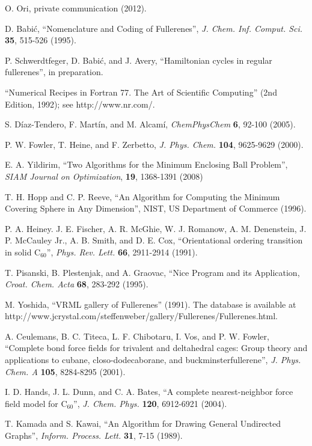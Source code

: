 \documentclass[article,a4paper,twoside]{memoir}
\newcommand{\C}[1]{\ensuremath{\mathrm{C}_{#1}}}
\begin{document}
\begin{thebibliography}{99}
 O. Ori, private communication (2012).

 D. Babi\'c, ``Nomenclature and Coding of Fullerenes'', \textit{J. Chem. Inf. Comput. Sci.} \textbf{35}, 515-526 (1995).

 P. Schwerdtfeger, D. Babi\'c, and J. Avery, ``Hamiltonian cycles in regular fullerenes'', in preparation.

 ``Numerical Recipes in Fortran 77. The Art of Scientific Computing'' (2nd Edition, 1992); see http://www.nr.com/.

 S. D\'iaz-Tendero, F. Mart\'in, and M. Alcam\'i, \textit{ChemPhysChem} \textbf{6}, 92-100 (2005).

 P. W. Fowler, T. Heine, and F. Zerbetto, \textit{J. Phys. Chem.} \textbf{104}, 9625-9629 (2000).

 E. A. Yildirim, ``Two Algorithms for the Minimum Enclosing Ball Problem'', 
\textit{SIAM Journal on Optimization}, \textbf{19}, 1368-1391 (2008) 

 T. H. Hopp and C. P. Reeve, ``An Algorithm for Computing the Minimum Covering Sphere in Any Dimension'', 
NIST, US Department of Commerce (1996).

 P. A. Heiney. J. E. Fischer, A. R. McGhie, W. J. Romanow, A. M. Denenstein, J. P. McCauley Jr., A. B. Smith, and D. E. Cox,
``Orientational ordering transition in solid \C{60}'', \textit{Phys. Rev. Lett.} \textbf{66}, 2911-2914 (1991).

 T. Pisanski, B. Plestenjak, and A. Graovac, ``Nice Program and its Application, \textit{Croat. Chem. Acta} \textbf{68}, 283-292 (1995).

 M. Yoshida, ``VRML gallery of Fullerenes'' (1991). The database is available at http://www.jcrystal.com/steffenweber/gallery/Fullerenes/Fullerenes.html.

 A. Ceulemans, B. C. Titeca, L. F. Chibotaru, I. Vos, and P. W. Fowler, ``Complete bond force fields for trivalent and deltahedral cages: Group theory and applications to cubane, closo-dodecaborane, and buckminsterfullerene'', \textit{J. Phys. Chem. A} \textbf{105}, 8284-8295 (2001).

 I. D. Hands, J. L. Dunn, and C. A. Bates, ``A complete nearest-neighbor force field model for \C{60}'', 
\textit{J. Chem. Phys.} \textbf{120}, 6912-6921 (2004).

 T. Kamada and S. Kawai, ``An Algorithm for Drawing General Undirected Graphs'', \textit{Inform. Process. Lett.} \textbf{31}, 7-15 (1989).

\end{thebibliography}
\end{document}
